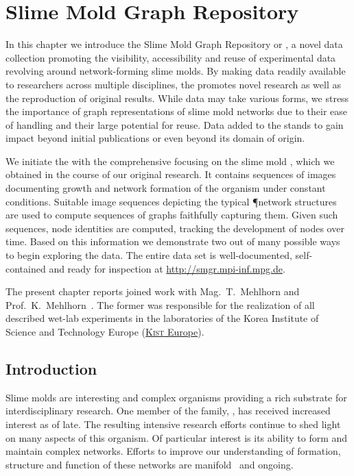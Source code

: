 \chapter{Slime Mold Graph Repository}\label{chap:smgr}

	In this chapter we introduce the Slime Mold Graph Repository or \SMGR, a novel data collection promoting the visibility, accessibility and reuse of experimental data revolving around network-forming slime molds. By making data readily available to researchers across multiple disciplines, the \SMGR promotes novel research as well as the reproduction of original results. While \SMGR data may take various forms, we stress the importance of graph representations of slime mold networks due to their ease of handling and their large potential for reuse. Data added to the \SMGR stands to gain impact beyond initial publications or even beyond its domain of origin. 

	We initiate the \SMGR with the comprehensive \data focusing on the slime mold \Pp, which we obtained in the course of our original research. It contains sequences of images documenting growth and network formation of the organism under constant conditions. Suitable image sequences depicting the typical \P network structures are used to compute sequences of graphs faithfully capturing them. Given such sequences, node identities are computed, tracking the development of nodes over time. Based on this information we demonstrate two out of many possible ways to begin exploring the data. The entire data set is well-documented, self-contained and ready for inspection at \href{http://smgr.mpi-inf.mpg.de}{http://smgr.mpi-inf.mpg.de}.

	The present chapter reports joined work with Mag.~T.~Mehlhorn and Prof.~K.~Mehlhorn~\cite{SMGR}. The former was responsible for the realization of all described wet-lab experiments in the laboratories of the Korea Institute of Science and Technology Europe (\href{www.kist-europe.de}{\textsc{Kist} Europe}).

\section{Introduction}

	Slime molds are interesting and complex organisms providing a rich substrate for interdisciplinary research. One member of the family, \Pp, has received increased interest as of late. The resulting intensive research efforts continue to shed light on many aspects of this organism. Of particular interest is its ability to form and maintain complex networks. Efforts to improve our understanding of formation, structure and function of these networks are manifold~\cite{Marwan419,tero2010rules,alim2013random,baumgarten2010plasmodial,baumgarten2013functional} and ongoing.

